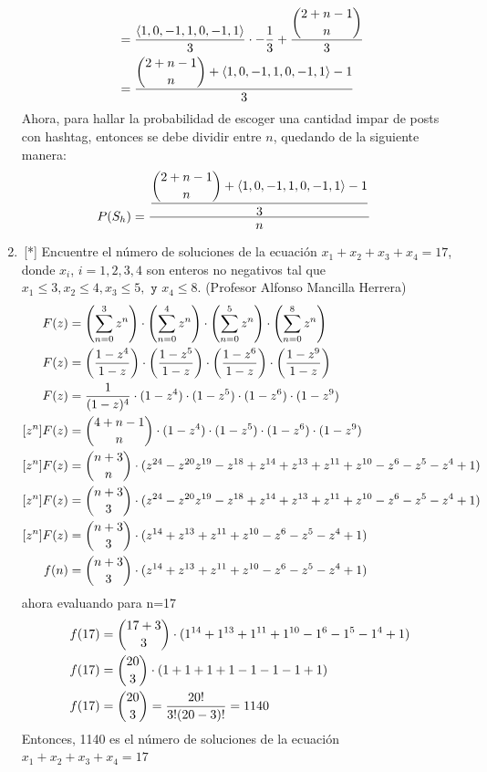 \begin{enumerate}
\begin{align*}
    &= \dfrac{\langle 1,0,-1,1,0,-1,1\rangle}{3} \cdot - \dfrac{1}{3} + \dfrac{\dbinom{2 + n -1}{n}}{3} \\
    &= \dfrac{ \dbinom{2 + n -1}{n} + \langle 1,0,-1,1,0,-1,1\rangle - 1 }{3}
\end{align*}
Ahora, para hallar la probabilidad de escoger una cantidad impar  de posts con hashtag, entonces se debe dividir entre $n$, quedando de la siguiente manera:\\
\begin{align*}
    P(S_h) &= \dfrac{\dfrac{ \dbinom{2 + n -1}{n} + \langle 1,0,-1,1,0,-1,1\rangle - 1 }{3}}{n}
\end{align*}
\item \,[*] Encuentre el número de soluciones de la ecuación $ x_1 + x_2 +
x_3 + x_4 = 17$, donde $x_i$, $i = 1, 2, 3, 4$ son enteros no negativos tal que $x_1 \le 3, x_2 \le 4, x_3 \le 5, \texttt{ y } x_4 \le 8$.
(Profesor Alfonso Mancilla Herrera)
\begin{align*}
    F(z) &= \left (\sum_{n=0}^3 z^n \right) \cdot  \left (\sum_{n=0}^4 z^n \right) \cdot \left (\sum_{n=0}^5 z^n \right) \cdot \left (\sum_{n=0}^8 z^n \right) \\ 
    F(z) &= \left ( \dfrac{1-z^4}{1-z} \right) \cdot  \left ( \dfrac{1-z^5}{1-z} \right) \cdot \left ( \dfrac{1-z^6}{1-z} \right) \cdot \left ( \dfrac{1-z^9}{1-z} \right)\\ 
    F(z) &= \dfrac{1}{(1-z)^4} \cdot (1-z^4) \cdot (1-z^5) \cdot (1-z^6) \cdot (1-z^9) \\
    [z^n]F(z) &= \dbinom{4+n-1}{n} \cdot (1-z^4) \cdot (1-z^5) \cdot (1-z^6) \cdot (1-z^9) \\
    [z^n]F(z) &= \dbinom{n+3}{n} \cdot (z^{24} - z^{20} z^{19} - z^{18} + z^{14} + z^{13} + z^{11} + z^{10} - z^6 - z^5 - z^4 + 1)\\
    [z^n]F(z) &= \dbinom{n+3}{3} \cdot (z^{24} - z^{20} z^{19} - z^{18} + z^{14} + z^{13} + z^{11} + z^{10} - z^6 - z^5 - z^4 + 1)\\
    [z^n]F(z) &= \dbinom{n+3}{3} \cdot (z^{14} + z^{13} + z^{11} + z^{10} - z^6 - z^5 - z^4 + 1)\\
    f(n) &= \dbinom{n+3}{3} \cdot (z^{14} + z^{13} + z^{11} + z^{10} - z^6 - z^5 - z^4 + 1)
\end{align*}
ahora evaluando para n=17
\begin{align*}
    f(17) &= \dbinom{17+3}{3} \cdot (1^{14} + 1^{13} + 1^{11} + 1^{10} - 1^6 - 1^5 - 1^4 + 1)\\
    f(17) &= \dbinom{20}{3} \cdot (1 + 1 + 1 + 1 - 1 - 1 - 1 + 1)\\
    f(17) &= \dbinom{20}{3}  = \dfrac{20!}{3!(20-3)!} = 1140
\end{align*}
Entonces, 1140 es el número de soluciones de la ecuación $ x_1 + x_2 + x_3 + x_4 = 17$


\end{enumerate}

